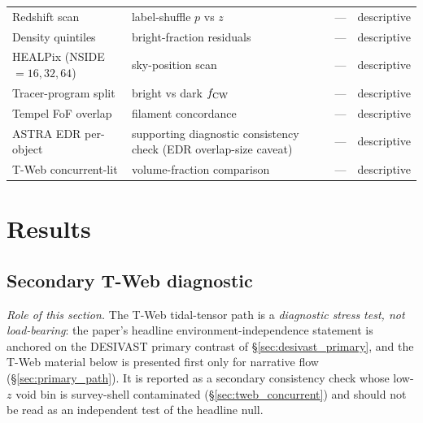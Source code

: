 \documentclass[aps,prd,twocolumn,superscriptaddress,showpacs,preprintnumbers,nofootinbib,longbibliography,floatfix]{revtex4-2}
\begin{document}
\begin{table}[ht]
\begin{ruledtabular}
\begin{tabular}{llcl}
Redshift scan & label-shuffle $p$ vs $z$ & --- & descriptive \\
Density quintiles & bright-fraction residuals & --- & descriptive \\
HEALPix (NSIDE $=16,32,64$) & sky-position scan & --- & descriptive \\
Tracer-program split & bright vs dark $f_{\rm CW}$ & --- & descriptive \\
Tempel FoF overlap & filament concordance & --- & descriptive \\
ASTRA EDR per-object & supporting diagnostic consistency check (EDR overlap-size caveat) & --- & descriptive \\
T-Web concurrent-lit & volume-fraction comparison & --- & descriptive \\
\end{tabular}
\end{ruledtabular}
\end{table}

\section{Results}\label{sec:results}

\subsection{Secondary T-Web diagnostic}\label{sec:results_vweb}

\emph{Role of this section.} The T-Web tidal-tensor path is a
\emph{diagnostic stress test, not load-bearing}: the paper's headline
environment-independence statement is anchored on the DESIVAST primary
contrast of \S\ref{sec:desivast_primary}, and the T-Web material below is
presented first only for narrative flow (\S\ref{sec:primary_path}).
It is reported as a secondary consistency check whose
low-$z$ void bin is survey-shell contaminated (\S\ref{sec:tweb_concurrent})
and should not be read as an independent test of the headline null.
\end{document}
